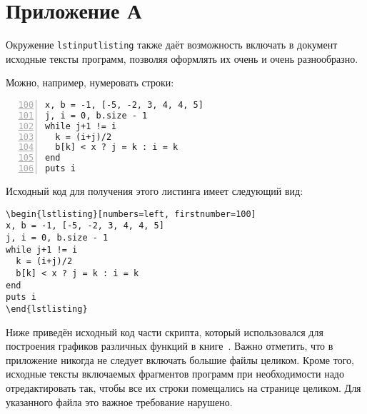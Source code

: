 \section{Приложение А}

Окружение \verb|lstinputlisting| также даёт возможность включать в документ
исходные тексты программ, позволяя оформлять их очень и очень разнообразно. 

Можно, например, нумеровать строки:

\begin{lstlisting}[numbers=left, firstnumber=100]
x, b = -1, [-5, -2, 3, 4, 4, 5]
j, i = 0, b.size - 1
while j+1 != i
  k = (i+j)/2
  b[k] < x ? j = k : i = k
end
puts i
\end{lstlisting}

Исходный код для получения этого листинга имеет следующий вид:

\begin{small}
\begin{verbatim}
\begin{lstlisting}[numbers=left, firstnumber=100]
x, b = -1, [-5, -2, 3, 4, 4, 5]
j, i = 0, b.size - 1
while j+1 != i
  k = (i+j)/2
  b[k] < x ? j = k : i = k
end
puts i
\end{lstlisting}
\end{verbatim}
\end{small}

Ниже приведён исходный код части скрипта, который использовался для построения
графиков различных функций в книге~\cite{roganov-jurists}. Важно отметить, что
в приложение никогда не следует включать большие файлы целиком. Кроме того, 
исходные тексты включаемых фрагментов программ при необходимости надо 
отредактировать так, чтобы все их строки помещались на странице целиком. Для
указанного файла это важное требование нарушено.




